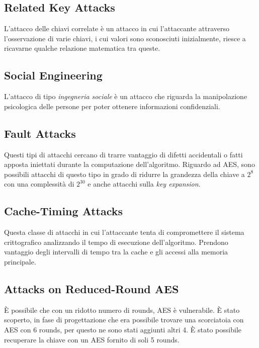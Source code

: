 \subsection{Related Key Attacks}

\textsf{\small L'attacco delle chiavi correlate è un attacco in cui l'attaccante attraverso l'osservazione di varie chiavi, i cui valori sono sconosciuti inizialmente, riesce a ricavarne qualche relazione matematica tra queste.} %

\subsection{Social Engineering}

\textsf{\small L'attacco di tipo \emph{ingegneria sociale} è un attacco che riguarda la manipolazione psicologica delle persone per poter ottenere informazioni confidenziali.}

\subsection{Fault Attacks}

\textsf{\small Questi tipi di attacchi cercano di trarre vantaggio di difetti accidentali o fatti apposta iniettati durante la computazione dell'algoritmo. Riguardo ad AES, sono possibili attacchi di questo tipo in grado di ridurre la grandezza della chiave a $2^8$ con una complessità di $2^{30}$ e anche attacchi sulla \emph{key expansion}.}

\subsection{Cache-Timing Attacks}

\textsf{\small Questa classe di attacchi in cui l'attaccante tenta di compromettere il sistema crittografico analizzando il tempo di esecuzione dell'algoritmo. Prendono vantaggio degli intervalli di tempo tra la cache e gli accessi alla memoria principale.}

\subsection{Attacks on Reduced-Round AES}

\textsf{\small È possibile che con un ridotto numero di rounds, AES è vulnerabile. È stato scoperto, in fase di progettazione che era possibile trovare una scorciatoia con AES con 6 rounds, per questo ne sono stati aggiunti altri 4. È stato possibile recuperare la chiave con un AES fornito di soli 5 rounds.}


